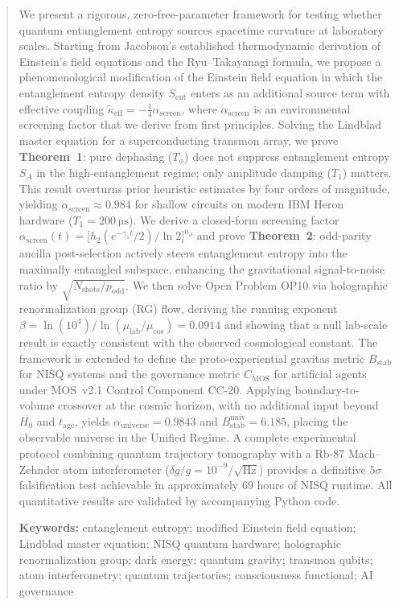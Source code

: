 \documentclass[12pt,a4paper]{article}
\theoremstyle{monette}
\theoremstyle{definition}
\newcommand{\SA}{S_A}
\newcommand{\asc}{\alpha_{\mathrm{screen}}}
\newcommand{\keff}{\tilde{\kappa}_{\mathrm{eff}}}
\newcommand{\htwo}{h_2}
\newcommand{\Bstab}{B_{\mathrm{stab}}}
\newcommand{\CMOS}{C_{\mathrm{MOS}}}
\newcommand{\nprt}{n_{\partial}}
\newcommand{\gamone}{\gamma_1}
\newcommand{\Tone}{T_1}
\newcommand{\Tphi}{T_\phi}
\newcommand{\mulab}{\mu_{\mathrm{lab}}}
\newcommand{\mucos}{\mu_{\mathrm{cos}}}
\newcommand{\Sent}{S_{\mathrm{ent}}}
\newcommand{\alphaU}{\alpha_{\mathrm{universe}}}
\newcommand{\BU}{B_{\mathrm{stab}}^{\mathrm{univ}}}
\begin{document}
\begin{abstract}
\noindent
We present a rigorous, zero-free-parameter framework for testing whether quantum
entanglement entropy sources spacetime curvature at laboratory scales.
Starting from Jacobson's established thermodynamic derivation of Einstein's field
equations and the Ryu--Takayanagi formula, we propose a phenomenological
modification of the Einstein field equation in which the entanglement entropy density
$\Sent$ enters as an additional source term with effective coupling
$\keff = -\frac{1}{4}\asc$, where $\asc$ is an environmental screening factor
that we derive from first principles.
Solving the Lindblad master equation for a superconducting transmon array, we prove
\textbf{Theorem~1}: pure dephasing ($\Tphi$) does not suppress entanglement entropy
$\SA$ in the high-entanglement regime; only amplitude damping ($\Tone$) matters.
This result overturns prior heuristic estimates by four orders of magnitude, yielding
$\asc \approx 0.984$ for shallow circuits on modern IBM Heron hardware
($\Tone = \SI{200}{\micro\second}$).
We derive a closed-form screening factor
$\asc(t) = \bigl[\htwo(e^{-\gamone t}/2)/\ln 2\bigr]^{\nprt}$
and prove \textbf{Theorem~2}: odd-parity ancilla post-selection actively steers
entanglement entropy into the maximally entangled subspace, enhancing the gravitational
signal-to-noise ratio by $\sqrt{N_{\mathrm{shots}}/p_{\mathrm{odd}}}$.
We then solve Open Problem OP10 via holographic renormalization group (RG) flow,
deriving the running exponent $\beta = \ln(10^4)/\ln(\mulab/\mucos) = 0.0914$
and showing that a null lab-scale result is exactly consistent with the observed
cosmological constant.
The framework is extended to define the proto-experiential gravitas metric
$\Bstab$ for NISQ systems and the governance metric $\CMOS$ for artificial agents
under MOS~v2.1 Control Component CC-20.
Applying boundary-to-volume crossover at the cosmic horizon, with no additional
input beyond $H_0$ and $t_{\mathrm{age}}$, yields
$\alphaU = 0.9843$ and $\BU = 6.185$,
placing the observable universe in the Unified Regime.
A complete experimental protocol combining quantum trajectory tomography with a
Rb-87 Mach--Zehnder atom interferometer ($\delta g/g = 10^{-9}/\sqrt{\mathrm{Hz}}$)
provides a definitive $5\sigma$ falsification test achievable in approximately
69 hours of NISQ runtime. All quantitative results are validated by accompanying
Python code.

\vspace{6pt}
\noindent\textbf{Keywords:}
entanglement entropy; modified Einstein field equation; Lindblad master equation;
NISQ quantum hardware; holographic renormalization group; dark energy; quantum gravity;
transmon qubits; atom interferometry; quantum trajectories; consciousness functional;
AI governance
\end{abstract}
\end{document}
